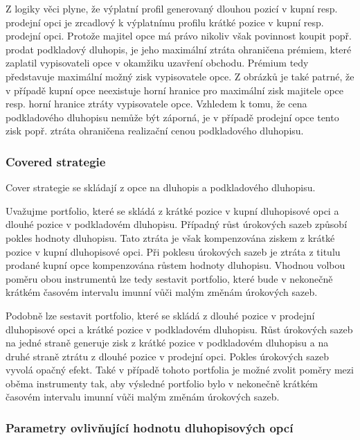 \documentclass[a4paper]{book}
\begin{document}
Z logiky věci plyne, že výplatní profil generovaný dlouhou pozicí v kupní resp. prodejní opci je zrcadlový k výplatnímu profilu krátké pozice v kupní resp. prodejní opci. Protože majitel opce má právo nikoliv však povinnost koupit popř. prodat podkladový dluhopis, je jeho maximální ztráta ohraničena prémiem, které zaplatil vypisovateli opce v okamžiku uzavření obchodu. Prémium tedy představuje maximální možný zisk vypisovatele opce. Z obrázků je také patrné, že v případě kupní opce neexistuje horní hranice pro maximální zisk majitele opce resp. horní hranice ztráty vypisovatele opce. Vzhledem k tomu, že cena podkladového dluhopisu nemůže být záporná, je v případě prodejní opce tento zisk popř. ztráta ohraničena realizační cenou podkladového dluhopisu.

\subsubsection{Covered strategie}

Cover strategie se skládají z opce na dluhopis a podkladového dluhopisu.

Uvažujme portfolio, které se skládá z krátké pozice v kupní dluhopisové opci a dlouhé pozice v podkladovém dluhopisu. Případný růst úrokových sazeb způsobí pokles hodnoty dluhopisu. Tato ztráta je však kompenzována ziskem z krátké pozice v kupní dluhopisové opci. Při poklesu úrokových sazeb je ztráta z titulu prodané kupní opce kompenzována růstem hodnoty dluhopisu. Vhodnou volbou poměru obou instrumentů lze tedy sestavit portfolio, které bude v nekonečně krátkém časovém intervalu imunní vůči malým změnám úrokových sazeb.

Podobně lze sestavit portfolio, které se skládá z dlouhé pozice v prodejní dluhopisové opci a krátké pozice v podkladovém dluhopisu. Růst úrokových sazeb na jedné straně generuje zisk z krátké pozice v podkladovém dluhopisu a na druhé straně ztrátu z dlouhé pozice v prodejní opci. Pokles úrokových sazeb vyvolá opačný efekt. Také v případě tohoto portfolia je možné zvolit poměry mezi oběma instrumenty tak, aby výsledné portfolio bylo v nekonečně krátkém časovém intervalu imunní vůči malým změnám úrokových sazeb.

\subsubsection{Parametry ovlivňující hodnotu dluhopisových opcí}
\end{document}
